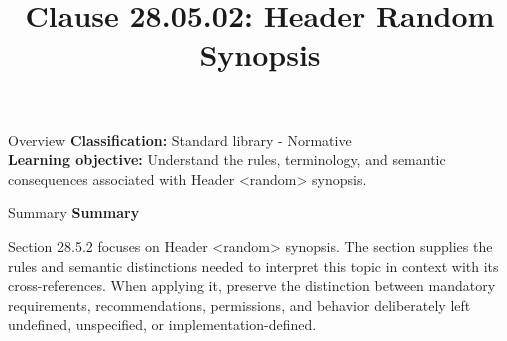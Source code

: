 \documentclass[10pt,letterpaper]{article}
\title{Clause 28.05.02: Header Random Synopsis}
\author{}
\date{}
\begin{document}
\maketitle
\begin{CornellOverviewBox}{Overview}
\textbf{Classification:} Standard library - Normative\\[2pt]
\textbf{Learning objective:} Understand the rules, terminology, and semantic consequences associated with Header <random> synopsis.
\end{CornellOverviewBox}\begin{CornellSummaryBox}{Summary}
{\sffamily\bfseries\color{Accent} Summary}\par\vspace{3pt}Section 28.5.2 focuses on Header <random> synopsis. The section supplies the rules and semantic distinctions needed to interpret this topic in context with its cross-references. When applying it, preserve the distinction between mandatory requirements, recommendations, permissions, and behavior deliberately left undefined, unspecified, or implementation-defined.
\end{CornellSummaryBox}
\end{document}
